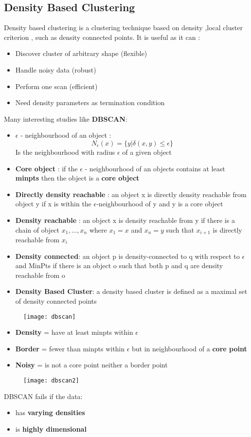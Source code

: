 \subsection{Density Based Clustering}
Density based clustering is a clustering technique based on density ,local cluster criterion , such as density connected points. It is useful as it can :
\begin{itemize}
\item Discover cluster of arbitrary shape (flexible)
\item Handle noisy data (robust)
\item Perform one scan (efficient)
\item Need density parameters as termination condition
\end{itemize}
Many interesting studies like \textbf{DBSCAN}:
\begin{itemize}
\item $\epsilon$ - neighbourhood of an object :
 $$ N_{\epsilon}(x) = \{ y | \delta(x,y) \leq \epsilon \}$$
 Is the neighbourhood with radius $\epsilon$ of a given object
\item \textbf{Core object} : if the $\epsilon$ - neighbourhood of an objects contains at least \textbf{minpts} then the object is a \textbf{core object}
\item \textbf{Directly density reachable} : an object x is directly density reachable from object y if x is within the $\epsilon$-neighbourhood of y and y is a core object
\item \textbf{Density reachable} : an object x is density reachable from y if there is a chain of object $x_1,...,x_n$ where $x_1=x$ and $x_n = y$ such that $x_{i+1}$ is directly reachable from $x_i$
\item \textbf{Density connected}: an object p is density-connected to q with respect to $\epsilon$ and MinPts if there is an object o such that both p and q are density reachable from o
\item \textbf{Density Based Cluster}: a density based cluster is defined as a maximal set of density connected points
\end{itemize}
\begin{figure}[H]
  \centering
  \texttt{[image: dbscan]}
\end{figure}
\begin{itemize}
\item \textbf{Density} = have at least minpts within $\epsilon$
\item \textbf{Border} = fewer than minpts within $\epsilon$ but in neighbourhood of a \textbf{core point}
\item \textbf{Noisy} = is not a core point neither a border point
\end{itemize}
\begin{figure}[H]
  \centering
  \texttt{[image: dbscan2]}
\end{figure}
DBSCAN fails if the data:
\begin{itemize}
\item has \textbf{varying densities}
\item is \textbf{highly dimensional}
\end{itemize}


